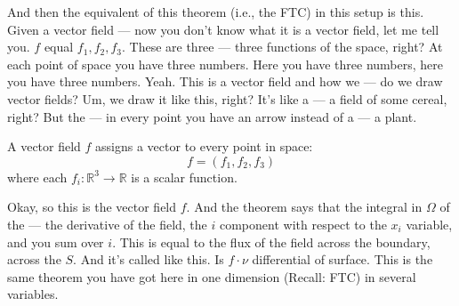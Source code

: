\begin{spoken-clean}[00:12:28 - 00:13:32]
And then the equivalent of this theorem (i.e., the FTC) in this setup is this. Given a vector field — now you don't know what it is a vector field, let me tell you. $f$ equal $f_1, f_2, f_3$. These are three — three functions of the space, right? At each point of space you have three numbers. Here you have three numbers, here you have three numbers. Yeah. This is a vector field and how we — do we draw vector fields? Um, we draw it like this, right? It's like a — a field of some cereal, right? But the — in every point you have an arrow instead of a — a plant.
\end{spoken-clean}

\begin{math-stroke}
A vector field $f$ assigns a vector to every point in space:
\[ f = (f_1, f_2, f_3) \]
where each $f_i: \mathbb{R}^3 \to \mathbb{R}$ is a scalar function.

\begin{center}
\end{center}
\end{math-stroke}

\begin{spoken-clean}[00:13:32 - 00:15:15]
Okay, so this is the vector field $f$. And the theorem says that the integral in $\Omega$ of the — the derivative of the field, the $i$ component with respect to the $x_i$ variable, and you sum over $i$. This is equal to the flux of the field across the boundary, across the $S$. And it's called like this. Is $f \cdot \nu$ differential of surface. This is the same theorem you have got here in one dimension (Recall: FTC) in several variables.
\end{spoken-clean}

